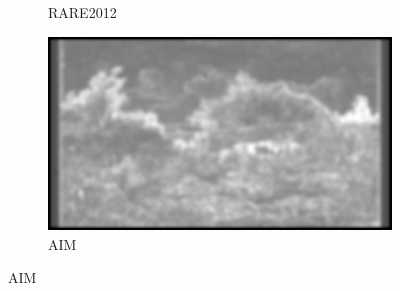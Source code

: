 \begin{figure}[ht]
\begin{subfigure}{0.24\textwidth}
        \caption{RARE2012}
    \end{subfigure}
    \begin{subfigure}{0.24\textwidth}
        \includegraphics[width=\linewidth]{datas/predictions/aim_cows_at_a_pond_Bilders_1856.jpg}
        \caption{AIM}
    \end{subfigure}


\end{figure}
